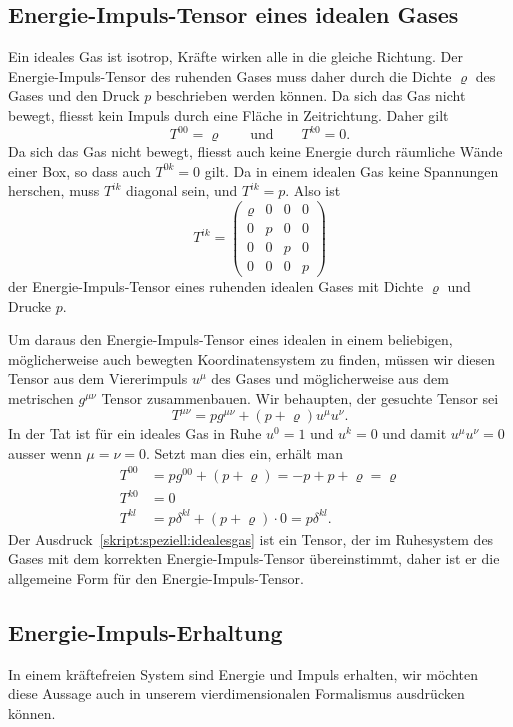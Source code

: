 
\subsection{Energie-Impuls-Tensor eines idealen Gases}
Ein ideales Gas ist isotrop, Kräfte wirken alle in die gleiche
Richtung.
Der Energie-Impuls-Tensor des ruhenden Gases muss daher durch die
Dichte $\varrho$ des Gases und den Druck $p$ beschrieben werden können.
Da sich das Gas nicht bewegt, fliesst kein Impuls durch eine Fläche
in Zeitrichtung.
Daher gilt
\[
T^{00}
=
\varrho
\qquad
\text{und}
\qquad
T^{k0}
=
0.
\]
Da sich das Gas nicht bewegt, fliesst auch keine Energie durch räumliche
Wände einer Box, so dass auch $T^{0k}=0$ gilt.
Da in einem idealen Gas keine Spannungen herschen, muss $T^{ik}$ diagonal
sein, und $T^{ik}=p$.
Also ist
\[
T^{ik}
=
\begin{pmatrix}
\varrho&0&0&0\\
0&p&0&0\\
0&0&p&0\\
0&0&0&p
\end{pmatrix}
\]
der Energie-Impuls-Tensor eines ruhenden idealen Gases mit Dichte
$\varrho$ und Drucke $p$.

Um daraus den Energie-Impuls-Tensor eines idealen in einem
beliebigen, möglicherweise auch bewegten Koordinatensystem zu
finden, müssen wir diesen Tensor aus dem Viererimpuls $u^\mu$
des Gases und möglicherweise aus dem metrischen $g^{\mu\nu}$ Tensor
zusammenbauen.
Wir behaupten, der gesuchte Tensor sei
\begin{equation}
T^{\mu\nu}
=
p g^{\mu\nu} + (p + \varrho)u^\mu u^\nu.
\label{skript:speziell:idealesgas}
\end{equation}
In der Tat ist für ein ideales Gas in Ruhe $u^0=1$ und $u^k=0$ und damit
$u^\mu u^\nu=0$ ausser wenn $\mu=\nu=0$.
Setzt man dies ein, erhält man
\begin{align*}
T^{00}
&=
pg^{00} + (p+\varrho) = -p+p+\varrho=\varrho
\\
T^{k0}
&=0
\\
T^{kl}
&=
p\delta^{kl}
+
(p+\varrho)\cdot 0
=
p\delta^{kl}.
\end{align*}
Der Ausdruck~\eqref{skript:speziell:idealesgas} ist ein Tensor, der
im Ruhesystem des Gases mit dem korrekten Energie-Impuls-Tensor
übereinstimmt,
daher ist er die allgemeine Form für den Energie-Impuls-Tensor.

\subsection{Energie-Impuls-Erhaltung}
In einem kräftefreien System sind Energie und Impuls erhalten, wir
möchten diese Aussage auch in unserem vierdimensionalen Formalismus
ausdrücken können.

